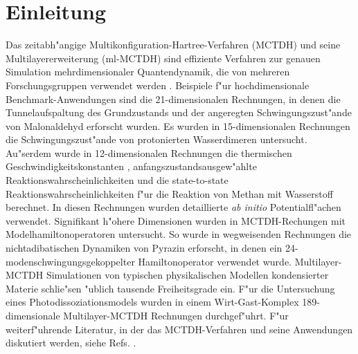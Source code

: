 \chapter{Einleitung}
\label{ch:einleitung}

Das zeitabh"angige Multikonfiguration-Hartree-Verfahren (MCTDH) 
\cite{MMC, MMC1} und seine Multilayererweiterung (ml-MCTDH)
\cite{WT3, Mreview2} 
sind effiziente Verfahren zur genauen Simulation mehrdimensionaler Quantendynamik,
die von mehreren Forschungsgruppen verwendet werden 
\cite{MCTDHex1, WestPNM, MCTDHex2, W1, MCTDHex4, MCTDHex5, MCTDHex6, MCTDHex7, MCTDHex8,
MCTDHex9, MCTDHex10, MCTDHex11, MCTDHex12, MCTDHex13, MCTDHex14, MCTDHex15, MCTDHex16, MCTDHex17,MCTDHex18}. 
Beispiele f"ur hochdimensionale 
Benchmark-Anwendungen sind die 21-dimen\-sio\-nalen Rechnungen, in denen die Tunnelaufspaltung des
Grundzustands \cite{CVM, HCVM, HaM1, MAMCTDH, HaM2, MAMCTDH2} und der angeregten \cite{HCVM, HaM1, MAMCTDH, HaM2, MAMCTDH2}
Schwingungszust"ande von Malonaldehyd erforscht wurden. 
Es wurden in 15-dimen\-sio\-nalen Rechnungen die Schwingungszust"ande von protonierten 
Wasserdi\-meren  \cite{H5O2+MCTDH, H5O2+MCTDH2, H5O2+MCTDH3, H5O2+MCTDH4, H5O2+MCTDH5} untersucht. 
Au"serdem wurde in 12-dimensionalen Rechnungen die thermischen 
Geschwindig\-keitskonstanten \cite{HM1, HM2, WWM, SM, vHNM,NvHM}, anfangszustandsausgew"ahlte Reaktionswahr\-scheinlichkeiten
\cite{SM02, SM04, WeM5, WeM6, WeM8} und die 
state-to-state Reaktionswahrscheinlichkeiten \cite{WeM7} f"ur die Reaktion von Methan mit Wasserstoff 
berechnet. In diesen Rechnungen wurden detaillierte \textit{ab initio} 
Potentialfl"achen verwendet. Signifikant h"ohere Dimensionen wurden in MCTDH-Rechungen mit 
Modelhamiltonoperatoren untersucht. So wurde in wegweisenden Rechnungen  
die nichtadibatischen Dynamiken von Pyrazin erforscht, in denen ein 24-modenschwingungsgekoppelter 
Hamiltonoperator \cite{WMC, WMC2, RWMC} verwendet wurde.
Multila\-yer-MCTDH Simulationen von typischen
physikalischen Modellen \cite{WT3, W1, WST, KCBWT, CTW2, WPHT} kondensierter Materie schlie"sen "ublich tausende Freiheitsgrade ein.
F"ur die Untersuchung eines Photodissoziationsmodels wurden in einem Wirt-Gast-Komplex 189-dimensionale 
Multila\-yer-MCTDH Rechnungen  durchgef"uhrt\cite{WBRSM}. 
F"ur weiterf"uhrende Literatur, in der das MCTDH-Verfahren und seine Anwendungen diskutiert werden, siehe Refs. \cite{MCTDHreview, MCTDHreview2, HMreview1, MCTDHbook,Mreview2011, MCTDHreview3}.

